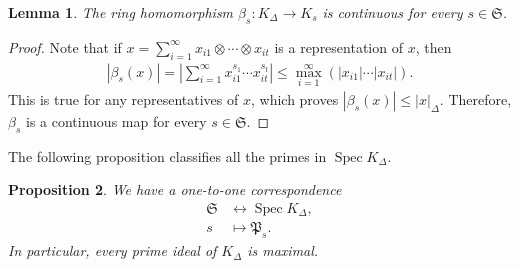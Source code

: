 \documentclass[12pts,a4paper]{amsart}
\newtheorem{proposition}{Proposition}[section]
\newtheorem{lemma}[proposition]{Lemma}
\DeclareMathOperator{\spec}{Spec}
\begin{document}
\begin{lemma}
	The ring homomorphism $\beta_s:K_\Delta\to K_s$ is continuous for every $s\in\mathfrak{S}$.
\end{lemma}

\begin{proof}
	Note that if $x=\sum\limits_{i=1}^\infty x_{i1}\otimes\cdots\otimes x_{it}$ is a representation of $x$, then
	\begin{align*}
		|\beta_s(x)|=|\sum\limits_{i=1}^\infty x^{s_1}_{i1}\cdots x^{s_t}_{it}|\leq \max\limits_{i=1}^\infty (|x_{i1}|\cdots |x_{it}|).
	\end{align*} 
	This is true for any representatives of $x$, which proves $|\beta_s(x)|\leq |x|_\Delta$. Therefore, $\beta_s$ is a continuous map for every $s\in\mathfrak{S}$.
\end{proof}

The following proposition classifies all the primes in $\spec K_\Delta$.

\begin{proposition}
	We have a one-to-one correspondence
	\begin{align*}
		\mathfrak{S}&\leftrightarrow \spec K_\Delta,\\
		                                                  s&\mapsto \mathfrak{P}_s.
	\end{align*}
	In particular, every prime ideal of $K_\Delta$ is maximal.
\end{proposition}
\end{document}
